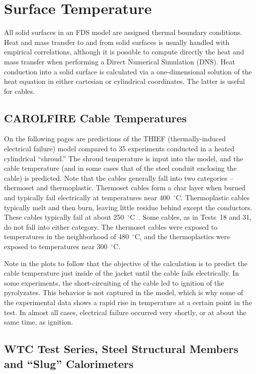 
\chapter{Surface Temperature}

All solid surfaces in an FDS model are assigned thermal boundary conditions.
Heat and mass transfer to and from solid surfaces is
usually handled with empirical correlations, although it is possible
to compute directly the heat and mass transfer when performing a
Direct Numerical Simulation (DNS). Heat conduction into a solid surface is calculated via a one-dimensional solution of
the heat equation in either cartesian or cylindrical coordinates. The latter is useful for cables.

\section{CAROLFIRE Cable Temperatures}

On the following pages are predictions of the THIEF (thermally-induced electrical failure) model compared to 35
experiments conducted in a heated cylindrical ``shroud.'' The shroud temperature is input into the model, and
the cable temperature (and in some cases that of the steel conduit enclosing the cable) is predicted. Note that the cables
generally fall into two categories -- thermoset and thermoplastic. Thermoset cables form a char layer when burned and typically
fail electrically at temperatures near 400~$^\circ$C. Thermoplastic cables typically melt and then burn, leaving little residue
behind except the conductors. These cables typically fail at about 250~$^\circ$C~\cite{CAROLFIRE}. Some cables, as in
Tests~18 and 31, do not fall into either category. The thermoset cables were exposed to temperatures in the neighborhood of
480~$^\circ$C, and the thermoplastics were exposed to temperatures near 300~$^\circ$C.

Note in the plots to follow that the objective of the calculation is to predict the cable temperature just inside of the
jacket until the cable fails electrically. In some experiments, the short-circuiting of the cable led to ignition of the
pyrolyzates. This behavior is not captured in the model, which is why some of the experimental data shows a rapid rise in
temperature at a certain point in the test. In almost all cases, electrical failure occurred very shortly, or at about the
same time, as ignition.

\clearpage

\section{WTC Test Series, Steel Structural Members and ``Slug'' Calorimeters}

